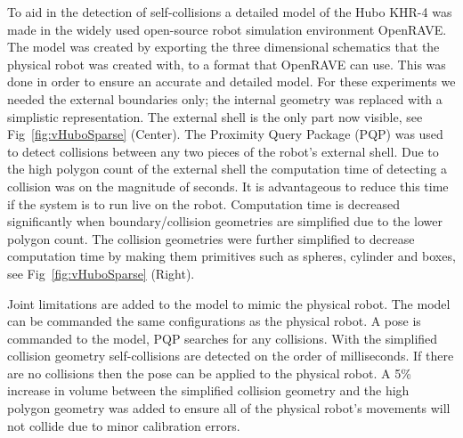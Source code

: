 To aid in the detection of self-collisions a detailed model of the Hubo KHR-4 was made in the widely used open-source robot simulation environment OpenRAVE\cite{diankovThesis}.  The model was created by exporting the three dimensional schematics that the physical robot was created with, to a format that OpenRAVE can use.  This was done in order to ensure an accurate and detailed model.  For these experiments we needed the external boundaries only; the internal geometry was replaced with a simplistic representation.  The external shell is the only part now visible, see Fig~\ref{fig:vHuboSparse} (Center).  The Proximity Query Package (PQP) was used to detect collisions between any two pieces of the robot's external shell.  Due to the high polygon count of the external shell the computation time of detecting a collision was on the magnitude of seconds.  It is advantageous to reduce this time if the system is to run live on the robot.  Computation time is decreased significantly when boundary/collision geometries are simplified due to the lower polygon count.  The collision geometries were further simplified to decrease computation time by making them primitives such as spheres, cylinder and boxes, see Fig~\ref{fig:vHuboSparse} (Right). 


Joint limitations are added to the model to mimic the physical robot.  The model can be commanded the same configurations as the physical robot.  A pose is commanded to the model, PQP searches for any collisions.  With the simplified collision geometry self-collisions are detected on the order of milliseconds.  If there are no collisions then the pose can be applied to the physical robot.  A 5\% increase in volume between the simplified collision geometry and the high polygon geometry was added to ensure all of the physical robot's movements will not collide due to minor calibration errors.



